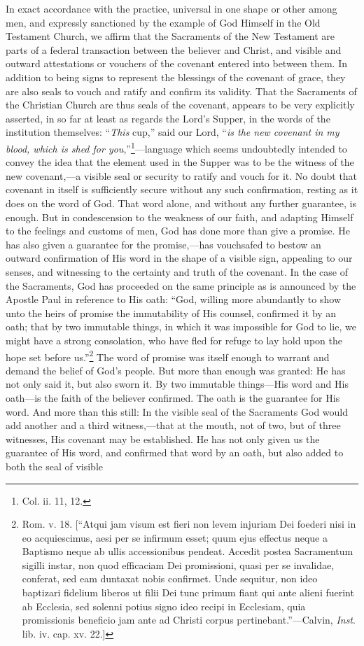 \documentclass[]{book}
\begin{document}
In exact accordance with the practice, universal in one shape or other among men, and expressly sanctioned by the example of God Himself in the Old Testament Church, we affirm that the Sacraments of the New Testament are parts of a federal transaction between the believer and Christ, and visible and outward attestations or vouchers of the covenant entered into between them. In addition to being signs to represent the blessings of the covenant of grace, they are also seals to vouch and ratify and confirm its validity. That the Sacraments of the Christian Church are thus seals of the covenant, appears to be very explicitly asserted, in so far at least as regards the Lord's Supper, in the words of the institution themselves: ``\emph{This} cup,'' said our Lord, ``\emph{is the new covenant in my blood, which is shed for you},''\footnote{Col. ii. 11, 12.}---language which seems undoubtedly intended to convey the idea that the element used in the Supper was to be the witness of the new covenant,---a visible seal or security to ratify and vouch for it. No doubt that covenant in itself is sufficiently secure without any such confirmation, resting as it does on the word of God. That word alone, and without any further guarantee, is enough. But in condescension to the weakness of our faith, and adapting Himself to the feelings and customs of men, God has done more than give a promise. He has also given a guarantee for the promise,---has vouchsafed to bestow an outward confirmation of His word in the shape of a visible sign, appealing to our senses, and witnessing to the certainty and truth of the covenant. In the case of the Sacraments, God has proceeded on the same principle as is announced by the Apostle Paul in reference to His oath: ``God, willing more abundantly to show unto the heirs of promise the immutability of His counsel, confirmed it by an oath; that by two immutable things, in which it was impossible for God to lie, we might have a strong consolation, who have fled for refuge to lay hold upon the hope set before us.''\footnote{Rom. v. 18. {[}``Atqui jam visum est fieri non levem injuriam Dei foederi nisi in eo acquiescimus, aesi per se infirmum esset; quum ejus effectus neque a Baptismo neque ab ullis accessionibus pendeat. Accedit postea Sacramentum sigilli instar, non quod efficaciam Dei promissioni, quasi per se invalidae, conferat, sed eam duntaxat nobis confirmet. Unde sequitur, non ideo baptizari fidelium liberos ut filii Dei tunc primum fiant qui ante alieni fuerint ab Ecclesia, sed solenni potius signo ideo recipi in Ecclesiam, quia promissionis beneficio jam ante ad Christi corpus pertinebant.''---Calvin, \emph{Inst}. lib. iv. cap. xv. 22.{]}} The word of promise was itself enough to warrant and demand the belief of God's people. But more than enough was granted: He has not only said it, but also sworn it. By two immutable things---His word and His oath---is the faith of the believer confirmed. The oath is the guarantee for His word. And more than this still: In the visible seal of the Sacraments God would add another and a third witness,---that at the mouth, not of two, but of three witnesses, His covenant may be established. He has not only given us the guarantee of His word, and confirmed that word by an oath, but also added to both the seal of visible 
\end{document}
